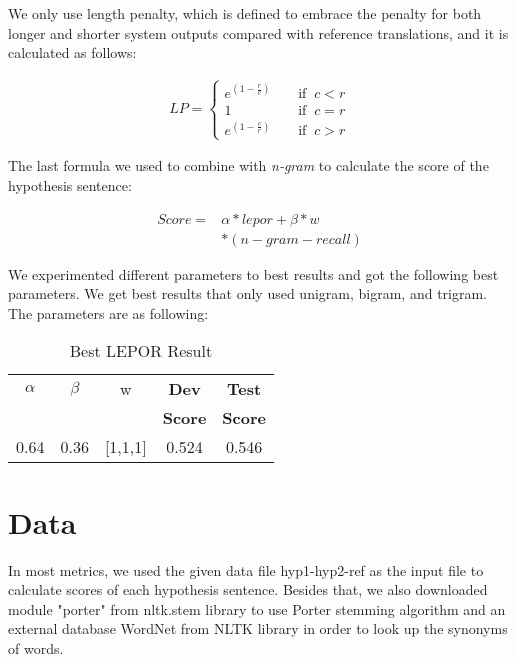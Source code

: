 \documentclass[11pt]{article}
\begin{document}
We only use length penalty, which is defined to embrace the penalty for both longer and shorter system outputs compared with reference translations, and it is calculated as follows:

\begin{equation}
\begin{aligned}
LP = \left\{\begin{matrix}
e^{(1-\frac{r}{c})} &  &\mbox{ if }\ {c < r}\\
1 &  &\mbox{ if }\ {c = r}\\ 
e^{(1-\frac{c}{r})} &  &\mbox{ if }\ {c > r}
\end{matrix}\right. 
\end{aligned}
\end{equation}

The last formula we used to combine with \emph{n-gram} to calculate the score of the hypothesis sentence:

\begin{equation}
\begin{aligned}
Score =& \alpha \ast lepor + \beta  \ast w \\& \ast (n-gram-recall)
\end{aligned}
\end{equation}

We experimented different parameters to best results and got the following best parameters. We get best results that only used unigram, bigram, and trigram. The parameters are as following:


\begin{table}[h]
\begin{center}
 \begin{tabular}{|c|c|c|c|c|} 
 \hline
$\alpha$ & $\beta$ & w & {\bf Dev} & {\bf Test }\\ [0.5ex]
$ $ & $ $ &  & {\bf  Score} & {\bf Score }\\ [0.5ex]
\hline
0.64 & 0.36 & [1,1,1] & 0.524 & 0.546 \\
\hline
\end{tabular}
\end{center}
\caption{\label{tab:lepor} Best LEPOR  Result }
\end{table}


\section{Data}
In most metrics, we used the given data file hyp1-hyp2-ref as the input file to calculate scores of each hypothesis sentence. Besides that, we also downloaded module "porter" from nltk.stem library to use Porter stemming algorithm and an external database WordNet from NLTK library in order to look up the synonyms of words.
\end{document}
